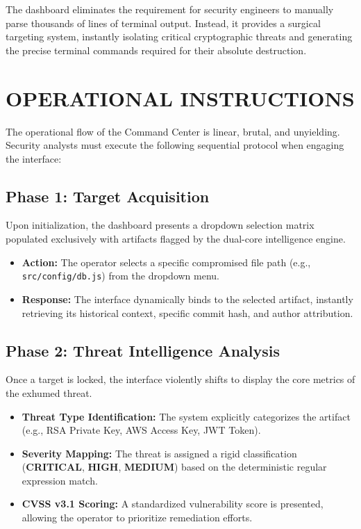 \documentclass[12pt, a4paper, oneside]{report}
\begin{document}
The dashboard eliminates the requirement for security engineers to manually parse thousands of lines of terminal output. Instead, it provides a surgical targeting system, instantly isolating critical cryptographic threats and generating the precise terminal commands required for their absolute destruction.

\section{OPERATIONAL INSTRUCTIONS}
The operational flow of the Command Center is linear, brutal, and unyielding. Security analysts must execute the following sequential protocol when engaging the interface:

\subsection{Phase 1: Target Acquisition}
Upon initialization, the dashboard presents a dropdown selection matrix populated exclusively with artifacts flagged by the dual-core intelligence engine.
\begin{itemize}
    \item \textbf{Action:} The operator selects a specific compromised file path (e.g., \texttt{src/config/db.js}) from the dropdown menu.
    \item \textbf{Response:} The interface dynamically binds to the selected artifact, instantly retrieving its historical context, specific commit hash, and author attribution.
\end{itemize}

\subsection{Phase 2: Threat Intelligence Analysis}
Once a target is locked, the interface violently shifts to display the core metrics of the exhumed threat.
\begin{itemize}
    \item \textbf{Threat Type Identification:} The system explicitly categorizes the artifact (e.g., RSA Private Key, AWS Access Key, JWT Token).
    \item \textbf{Severity Mapping:} The threat is assigned a rigid classification (\textbf{CRITICAL}, \textbf{HIGH}, \textbf{MEDIUM}) based on the deterministic regular expression match.
    \item \textbf{CVSS v3.1 Scoring:} A standardized vulnerability score is presented, allowing the operator to prioritize remediation efforts.
\end{itemize}
\end{document}
